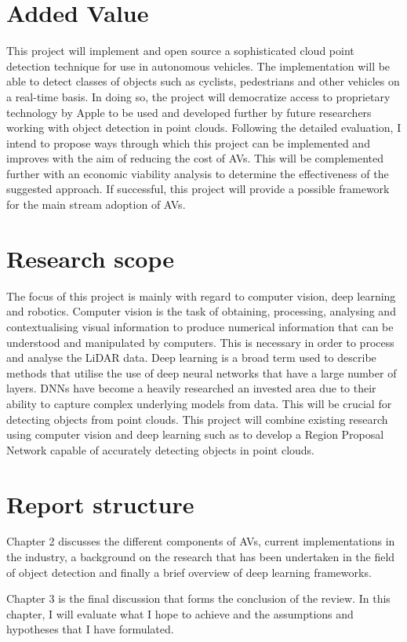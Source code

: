 \section{Added Value}

This project will implement and open source a sophisticated cloud point detection technique for use in autonomous vehicles. The implementation will be able to detect classes of objects such as cyclists, pedestrians and other vehicles on a real-time basis.
In doing so, the project will democratize access to proprietary technology by Apple \cite{zhou2017voxelnet} to be used and developed further by future researchers working with object detection in point clouds. 
Following the detailed evaluation, I intend to propose ways through which this project can be implemented and improves with the aim of reducing the cost of AVs. This will be complemented further with an economic viability analysis to determine the effectiveness of the suggested approach. 
If successful, this project will provide a possible framework for the main stream adoption of AVs. 

\section{Research scope}
The focus of this project is mainly with regard to computer vision, deep learning and robotics. Computer vision is the task of obtaining, processing, analysing and contextualising visual information to produce numerical information that can be understood and manipulated by computers. This is necessary in order to process and analyse the LiDAR data. Deep learning is a broad term used to describe methods that utilise the use of deep neural networks that have a large number of layers. DNNs have become a heavily researched an invested area due to their ability to capture complex underlying models from data. This will be crucial for detecting objects from point clouds. 
This project will combine existing research using computer vision and deep learning such as \cite{qi2017pointnet}\cite{zhou2017voxelnet} to develop a Region Proposal Network capable of accurately detecting objects in point clouds. 


\section{Report structure}

Chapter 2 discusses the different components of AVs, current implementations in the industry, a background on the research that has been undertaken in the field of object detection and finally a brief overview of deep learning frameworks. 

Chapter 3 is the final discussion that forms the conclusion of the review. In this chapter, I will evaluate what I hope to achieve and the assumptions and hypotheses that I have formulated. 


